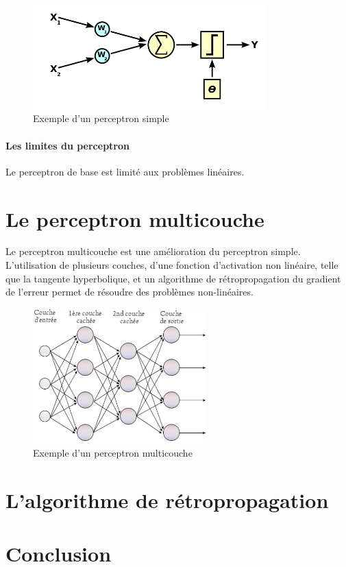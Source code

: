 \documentclass[a4paper]{article}
\begin{document}
	\begin{figure}[h]
		\centering
		\includegraphics[width=0.8\textwidth]{perceptron.png}
		\caption{Exemple d'un perceptron simple}
		\label{fig:plateau_de_gyges}
	\end{figure}

	\newpage
	\paragraph{Les limites du perceptron} Le perceptron de base est limité aux problèmes linéaires.

\section{Le perceptron multicouche}
	Le perceptron multicouche est une amélioration du perceptron simple. L'utilisation de plusieurs
	couches, d'une fonction d'activation non linéaire, telle que la tangente hyperbolique, et un
	algorithme de rétropropagation du gradient de l'erreur permet de résoudre des problèmes non-linéaires.

	\begin{figure}[h]
		\centering
		\includegraphics[width=0.6\textwidth]{Perceptron_4layers.png}
		\caption{Exemple d'un perceptron multicouche}
		\label{fig:plateau_de_gyges}
	\end{figure}

\section{L'algorithme de rétropropagation}
	

\section{Conclusion}
\end{document}
